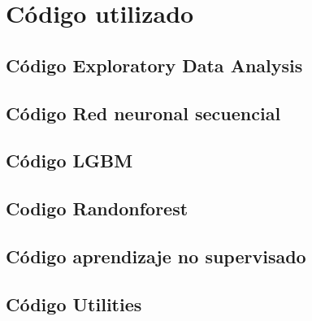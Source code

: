 \chapter{Código utilizado}

\section{Código Exploratory Data Analysis}


\section{Código Red neuronal secuencial}




\section{Código LGBM}


\section{Codigo Randonforest}



\section{Código aprendizaje no supervisado} 


\section{Código Utilities}






